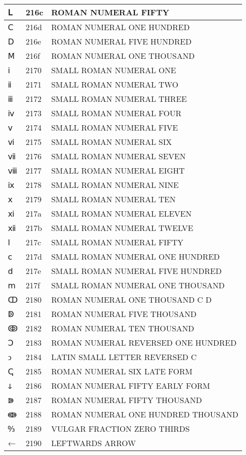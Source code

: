 \documentclass[12pt,letterpaper,openany]{book}
\begin{document}
\begin{center}
\begin{supertabular}{|m{0.25in}|m{0.5in}|m{4in}|}
Ⅼ & 216c & ROMAN NUMERAL FIFTY\\\hline
Ⅽ & 216d & ROMAN NUMERAL ONE HUNDRED\\\hline
Ⅾ & 216e & ROMAN NUMERAL FIVE HUNDRED\\\hline
Ⅿ & 216f & ROMAN NUMERAL ONE THOUSAND\\\hline
ⅰ & 2170 & SMALL ROMAN NUMERAL ONE\\\hline
ⅱ & 2171 & SMALL ROMAN NUMERAL TWO\\\hline
ⅲ & 2172 & SMALL ROMAN NUMERAL THREE\\\hline
ⅳ & 2173 & SMALL ROMAN NUMERAL FOUR\\\hline
ⅴ & 2174 & SMALL ROMAN NUMERAL FIVE\\\hline
ⅵ & 2175 & SMALL ROMAN NUMERAL SIX\\\hline
ⅶ & 2176 & SMALL ROMAN NUMERAL SEVEN\\\hline
ⅷ & 2177 & SMALL ROMAN NUMERAL EIGHT\\\hline
ⅸ & 2178 & SMALL ROMAN NUMERAL NINE\\\hline
ⅹ & 2179 & SMALL ROMAN NUMERAL TEN\\\hline
ⅺ & 217a & SMALL ROMAN NUMERAL ELEVEN\\\hline
ⅻ & 217b & SMALL ROMAN NUMERAL TWELVE\\\hline
ⅼ & 217c & SMALL ROMAN NUMERAL FIFTY\\\hline
ⅽ & 217d & SMALL ROMAN NUMERAL ONE HUNDRED\\\hline
ⅾ & 217e & SMALL ROMAN NUMERAL FIVE HUNDRED\\\hline
ⅿ & 217f & SMALL ROMAN NUMERAL ONE THOUSAND\\\hline
ↀ & 2180 & ROMAN NUMERAL ONE THOUSAND C D\\\hline
ↁ & 2181 & ROMAN NUMERAL FIVE THOUSAND\\\hline
ↂ & 2182 & ROMAN NUMERAL TEN THOUSAND\\\hline
Ↄ & 2183 & ROMAN NUMERAL REVERSED ONE HUNDRED\\\hline
ↄ & 2184 & LATIN SMALL LETTER REVERSED C\\\hline
ↅ & 2185 & ROMAN NUMERAL SIX LATE FORM\\\hline
ↆ & 2186 & ROMAN NUMERAL FIFTY EARLY FORM\\\hline
ↇ & 2187 & ROMAN NUMERAL FIFTY THOUSAND\\\hline
ↈ & 2188 & ROMAN NUMERAL ONE HUNDRED THOUSAND\\\hline
↉ & 2189 & VULGAR FRACTION ZERO THIRDS\\\hline
← & 2190 & LEFTWARDS ARROW\\\hline

\end{supertabular}
\end{center}
\end{document}
